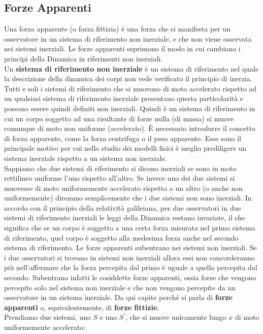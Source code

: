 \documentclass[a4paper,12pt, oneside]{book}
\begin{document}
\subsection{Forze Apparenti}
Una forza apparente (o forza fittizia) è una forza che si manifesta per un osservatore in un sistema di riferimento non inerziale, e che non viene osservata nei sistemi inerziali. Le forze apparenti esprimono il modo in cui cambiano i principi della Dinamica in riferimenti non inerziali.\\
Un \textbf{sistema di riferimento non inerziale} è un sistema di riferimento nel quale la descrizione della dinamica dei corpi non vede verificato il principio di inerzia. Tutti e soli i sistemi di riferimento che si muovono di moto accelerato rispetto ad un qualsiasi sistema di riferimento inerziale presentano questa particolarità e possono essere quindi definiti non inerziali. Quindi  è un sistema di riferimento in cui un corpo soggetto ad una risultante di forze nulla (di massa) si muove comunque di moto non uniforme (accelerato). È necessario introdurre il concetto di forza apparente, come la forza centrifuga o il peso apparente. Esse sono il principale motivo per cui nello studio dei modelli fisici è meglio prediligere un sistema inerziale rispetto a un sistema non inerziale.\\
Sappiamo che due sistemi di riferimento si dicono inerziali se sono in moto rettilineo uniforme l'uno rispetto all'altro. Se invece uno dei due sistemi si muovesse di moto uniformemente accelerato rispetto a un altro (o anche non uniformemente) diremmo semplicemente che i due sistemi non sono inerziali. In accordo con il principio della relatività galileiana, per due osservatori in due sistemi di riferimento inerziali le leggi della Dinamica restano invariate, il che significa che se un corpo è soggetto a una certa forza misurata nel primo sistema di riferimento, quel corpo è soggetto alla medesima forza anche nel secondo sistema di riferimento. Le forze apparenti subentrano nei sistemi non inerziali. Se i due osservatori si trovano in sistemi non inerziali allora essi non concorderanno più nell'affermare che la forza percepita dal primo è uguale a quella percepita dal secondo. Subentrano infatti le cosiddette forze apparenti, ossia forze che vengono percepite solo nel sistema non inerziale e che non vengono percepite da un osservatore in un sistema inerziale. Da qui capite perché si parla di \textbf{forze apparenti} o, equivalentemente, di \textbf{forze fittizie}. \\
Prendiamo due sistemi, uno $S$ e uno $S^{'}$, che si muove unicamente lungo $x$ di moto uniformemente accelerato:
\end{document}

